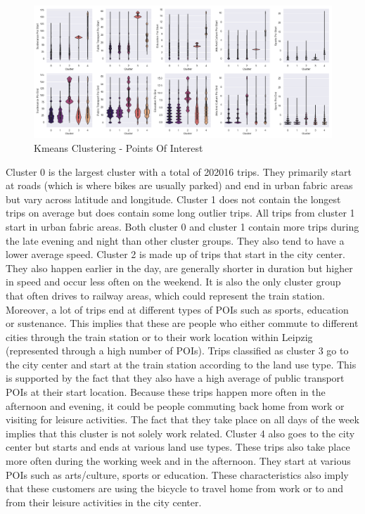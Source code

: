 \begin{figure}[htp]
    \centering
    \includegraphics[width=1\textwidth]{Figures/Clustering/clusters_sustenance_poi_start.png}
    \caption{Kmeans Clustering - Points Of Interest}
    \label{fig:kmeans_poi}
\end{figure}


Cluster 0 is the largest cluster with a total of 202016 trips. They primarily start at roads (which is where bikes are usually parked) and end in urban fabric areas but vary across latitude and longitude. Cluster 1 does not contain the longest trips on average but does contain some long outlier trips. All trips from cluster 1 start in urban fabric areas. Both cluster 0 and cluster 1 contain more trips during the late evening and night than other cluster groups. They also tend to have a lower average speed. Cluster 2 is made up of trips that start in the city center. They also happen earlier in the day, are generally shorter in duration but higher in speed and occur less often on the weekend. It is also the only cluster group that often drives to railway areas, which could represent the train station. Moreover, a lot of trips end at different types of POIs such as sports, education or sustenance. This implies that these are people who either commute to different cities through the train station or to their work location within Leipzig (represented through a high number of POIs). Trips classified as cluster 3 go to the city center and start at the train station according to the land use type. This is supported by the fact that they also have a high average of public transport POIs at their start location. Because these trips happen more often in the afternoon and evening, it could be people commuting back home from work or visiting for leisure activities. The fact that they take place on all days of the week implies that this cluster is not solely work related. Cluster 4 also goes to the city center but starts and ends at various land use types. These trips also take place more often during the working week and in the afternoon. They start at various POIs such as arts/culture, sports or education. These characteristics also imply that these customers are using the bicycle to travel home from work or to and from their leisure activities in the city center. 

